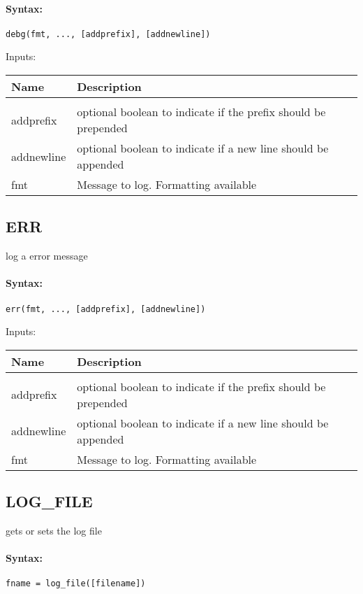 \paragraph{Syntax:} \verb|debg(fmt, ..., [addprefix], [addnewline])|

Inputs:

\begin{tabular}{|l|p{5cm}|}
\hline
\textbf{Name} & \textbf{Description} \\
\hline \hline \\
addprefix & optional boolean to indicate if the prefix should be prepended  \\ \hline
addnewline & optional boolean to indicate if a new line should be appended  \\ \hline
fmt & Message to log. Formatting available  \\ \hline
\end{tabular}

\subsection{ERR}

log a error message

\paragraph{Syntax:} \verb|err(fmt, ..., [addprefix], [addnewline])|

Inputs:

\begin{tabular}{|l|p{5cm}|}
\hline
\textbf{Name} & \textbf{Description} \\
\hline \hline \\
addprefix & optional boolean to indicate if the prefix should be prepended  \\ \hline
addnewline & optional boolean to indicate if a new line should be appended  \\ \hline
fmt & Message to log. Formatting available  \\ \hline
\end{tabular}

\subsection{LOG\_FILE}

gets or sets the log file

\paragraph{Syntax:} \verb|fname = log_file([filename])|

